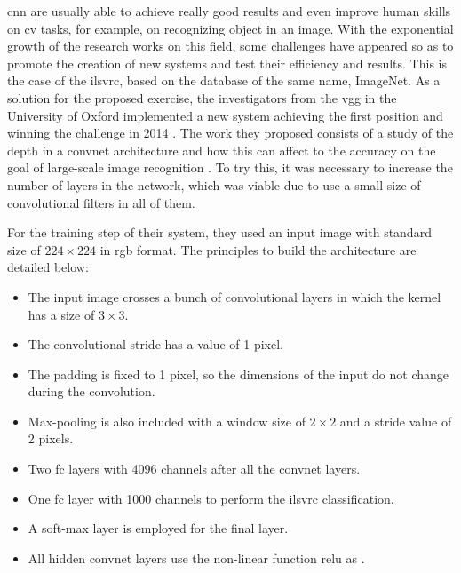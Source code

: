 	\acrfull{cnn} are usually able to achieve really good results and even improve human skills on \acrlong{cv} tasks, for example, on recognizing object in an image. With the exponential growth of the research works on this field, some challenges have appeared so as to promote the creation of new systems and test their efficiency and results. This is the case of the \acrfull{ilsvrc}, based on the database of the same name, ImageNet. As a solution for the proposed exercise, the investigators from the \acrfull{vgg} in the University of Oxford implemented a new system achieving the first position and winning the challenge in 2014 \cite{ImageNet2014}. The work they proposed consists of a study of the depth in a \acrlong{convnet} architecture and how this can affect to the accuracy on the goal of large-scale image recognition \cite{Simonyan2015}.  To try this, it was necessary to increase the number of layers in the network, which was viable due to use a small size of convolutional filters in all of them.
	
	For the training step of their system, they used an input image with standard size of $224 \times 224$ in \acrshort{rgb} format. The principles to build the architecture are detailed below:
	
	\begin{itemize}
		\item The input image crosses a bunch of convolutional layers in which the kernel has a size of $3 \times 3$.
		\item The convolutional stride has a value of 1 pixel.
		\item The padding is fixed to 1 pixel, so the dimensions of the input do not change during the convolution.
		\item Max-pooling is also included with a window size of $2 \times 2$ and a stride value of 2 pixels.
		\item Two \acrfull{fc} layers with 4096 channels after all the \acrlong{convnet} layers.
		\item One \acrshort{fc} layer with 1000 channels to perform the \acrshort{ilsvrc} classification.
		\item A soft-max layer is employed for the final layer.
		\item All hidden \acrlong{convnet} layers use the non-linear function \acrshort{relu} as .
	\end{itemize}

